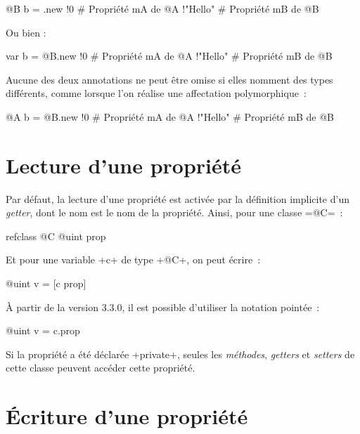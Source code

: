 \begin{galgas}
@B b = .new {
  !0 # Propriété mA de @A
  !"Hello" # Propriété mB de @B
}
\end{galgas}

Ou bien :
\begin{galgas}
var b = @B.new {
  !0 # Propriété mA de @A
  !"Hello" # Propriété mB de @B
}
\end{galgas}

Aucune des deux annotations ne peut être omise si elles nomment des types différents, comme lorsque l'on réalise une affectation polymorphique~:

\begin{galgas}
@A b = @B.new {
  !0 # Propriété mA de @A
  !"Hello" # Propriété mB de @B
}
\end{galgas}








\section{Lecture d'une propriété}

Par défaut, la lecture d'une propriété est activée par la définition implicite d'un \emph{getter}, dont le nom est le nom de la propriété. Ainsi, pour une classe \ggs=@C=~:

\begin{galgas}
refclass @C {
  @uint prop
}
\end{galgas}

Et pour une variable \ggs+c+ de type \ggs+@C+, on peut écrire~:

\begin{galgas}
@uint v = [c prop]
\end{galgas}

À partir de la version 3.3.0, il est possible d'utiliser la notation pointée~:
\begin{galgas}
@uint v = c.prop
\end{galgas}

Si la propriété a été déclarée \ggs+private+, seules les \emph{méthodes}, \emph{getters} et \emph{setters} de cette classe peuvent accéder cette propriété.








\section{Écriture d'une propriété}

